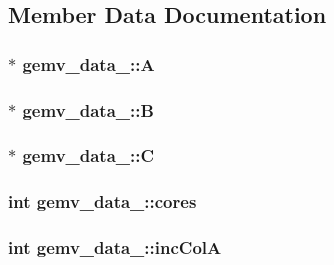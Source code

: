 \subsection{Member Data Documentation}
\subsubsection[{A}]{$\ast$ gemv\+\_\+data\+\_\+\+::A}\hypertarget{structgemv__data___a120de2b904677805467232c26b8af153}{}\label{structgemv__data___a120de2b904677805467232c26b8af153}
\subsubsection[{B}]{$\ast$ gemv\+\_\+data\+\_\+\+::B}\hypertarget{structgemv__data___a437fa8647c7e283563f8bcb4b4c379b2}{}\label{structgemv__data___a437fa8647c7e283563f8bcb4b4c379b2}
\subsubsection[{C}]{$\ast$ gemv\+\_\+data\+\_\+\+::C}\hypertarget{structgemv__data___a64d56e30c3d5a2ea8feabbe11bd2a70b}{}\label{structgemv__data___a64d56e30c3d5a2ea8feabbe11bd2a70b}
\subsubsection[{cores}]{\setlength{\rightskip}{0pt plus 5cm}int gemv\+\_\+data\+\_\+\+::cores}\hypertarget{structgemv__data___ae3041c12adc3a15238af64c157842672}{}\label{structgemv__data___ae3041c12adc3a15238af64c157842672}
\subsubsection[{inc\+ColA}]{\setlength{\rightskip}{0pt plus 5cm}int gemv\+\_\+data\+\_\+\+::inc\+ColA}\hypertarget{structgemv__data___a4820f4def0001079a93abb64dd04cfa3}{}\label{structgemv__data___a4820f4def0001079a93abb64dd04cfa3}
